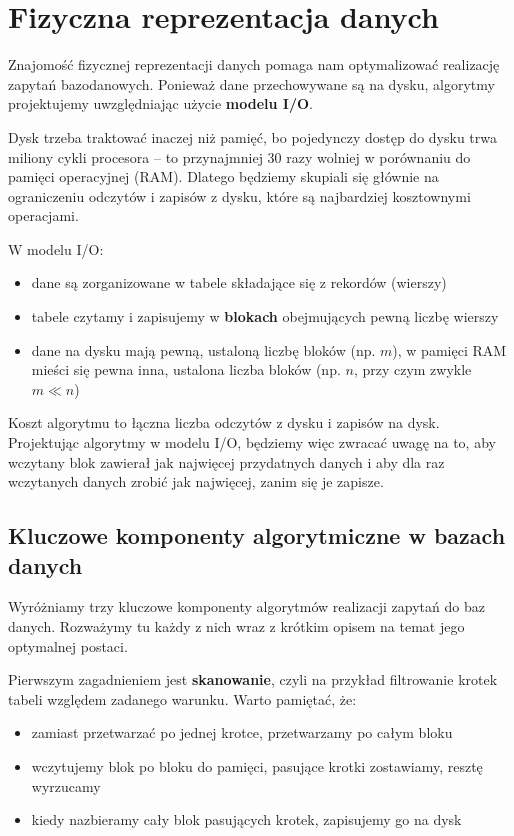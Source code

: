 \section{Fizyczna reprezentacja danych}

Znajomość fizycznej reprezentacji danych pomaga nam optymalizować realizację zapytań bazodanowych. Ponieważ dane przechowywane są na dysku, algorytmy projektujemy uwzględniając użycie \textbf{modelu I/O}.

Dysk trzeba traktować inaczej niż pamięć, bo pojedynczy dostęp do dysku trwa miliony cykli procesora -- to przynajmniej 30 razy wolniej w porównaniu do pamięci operacyjnej (RAM). Dlatego będziemy skupiali się głównie na ograniczeniu odczytów i zapisów z dysku, które są najbardziej kosztownymi operacjami.

W modelu I/O:
\begin{itemize}
    \item dane są zorganizowane w tabele składające się z rekordów (wierszy)
    \item tabele czytamy i zapisujemy w \textbf{blokach} obejmujących pewną liczbę  wierszy
    \item dane na dysku mają pewną, ustaloną liczbę bloków (np. $m$), w pamięci RAM mieści się pewna inna, ustalona liczba bloków (np. $n$, przy czym zwykle $m \ll n$)
\end{itemize}

Koszt algorytmu to łączna liczba odczytów z dysku i zapisów na dysk. Projektując algorytmy w modelu I/O, będziemy więc zwracać uwagę na to, aby wczytany blok zawierał jak najwięcej przydatnych danych i aby dla raz wczytanych danych zrobić jak najwięcej, zanim się je zapisze.

\subsection{Kluczowe komponenty algorytmiczne w bazach danych}

Wyróżniamy trzy kluczowe komponenty algorytmów realizacji zapytań do baz danych. Rozważymy tu każdy z nich wraz z krótkim opisem na temat jego optymalnej postaci.

\bigskip
Pierwszym zagadnieniem jest \textbf{skanowanie}, czyli na przykład filtrowanie krotek tabeli względem zadanego warunku. Warto pamiętać, że:
\begin{itemize}
    \item zamiast przetwarzać po jednej krotce, przetwarzamy po całym bloku
    \item wczytujemy blok po bloku do pamięci, pasujące krotki zostawiamy, resztę wyrzucamy
    \item kiedy nazbieramy cały blok pasujących krotek, zapisujemy go na dysk
\end{itemize}

